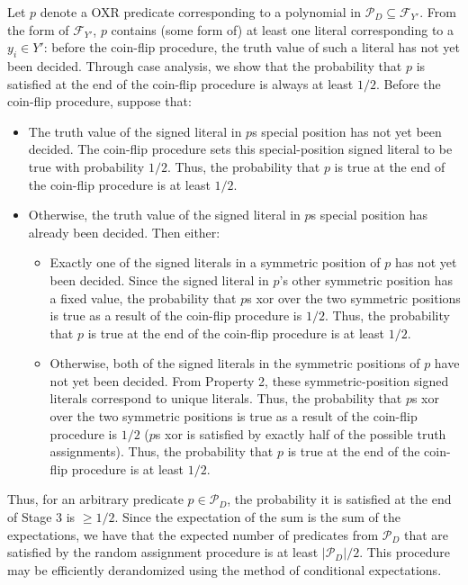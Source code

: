\documentclass{article}
\begin{document}
Let $p$ denote a OXR predicate corresponding to a polynomial in $\mathcal{P}_D\subseteq \mathcal{F}_{Y'}$. From the form of $\mathcal{F}_{Y'}$,  $p$ contains (some form of) at least one literal corresponding to a $y_i\in Y'$: before the coin-flip procedure, the truth value of such a literal has not yet been decided. Through case analysis, we show that the probability that $p$ is satisfied at the end of the coin-flip procedure is always at least $1/2$.
Before the coin-flip procedure, suppose that:
\begin{itemize}
\item The truth value of the signed literal in $p$s special position has not yet been decided. The coin-flip procedure sets this special-position signed literal to be true with probability $1/2$. Thus, the probability that $p$ is true at the end of the coin-flip procedure is at least $1/2$. 
\item Otherwise, the truth value of the signed literal in $p$s special position has already been decided. Then either:
\begin{itemize}
\item Exactly one of the signed literals in a symmetric position of $p$ has not yet been decided. Since the signed literal in $p$'s other symmetric position has a fixed value, the probability that $p$s xor over the two symmetric positions is true as a result of the coin-flip procedure is $1/2$. Thus, the probability that $p$ is true at the end of the coin-flip procedure is at least $1/2$. 
\item Otherwise, both of the signed literals in the symmetric positions of $p$ have not yet been decided. From Property 2, these symmetric-position signed literals correspond to unique literals. Thus, the probability that $p$s xor over the two symmetric positions is true as a result of the coin-flip procedure is $1/2$ ($p$s xor is satisfied by exactly half of the possible truth assignments). Thus, the probability that $p$ is true at the end of the coin-flip procedure is at least $1/2$. 
\end{itemize}
\end{itemize}
Thus, for an arbitrary predicate $p\in \mathcal{P}_D$, the probability it is satisfied at the end of Stage 3 is $\geq 1/2$. Since the expectation of the sum is the sum of the expectations, we have that the expected number of predicates from  $\mathcal{P}_D$ that are satisfied by the random assignment procedure is at least $|\mathcal{P}_D|/2$. This procedure may be efficiently derandomized using the method of conditional expectations.
\end{document}
